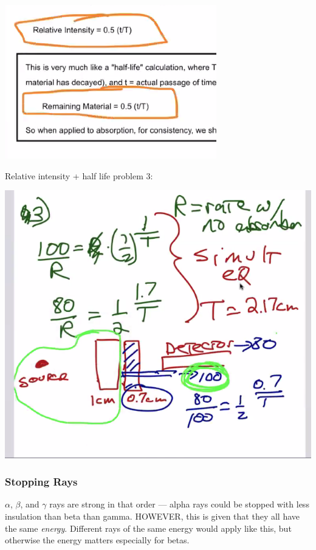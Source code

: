 \documentclass[letterpaper]{article}
\begin{document}
\begin{center}
\includegraphics[width=.9\linewidth]{halflife.png}
\end{center}

Relative intensity + half life problem 3:

\begin{center}
\includegraphics[width=.9\linewidth]{halflifeproctice.png}
\end{center}

\subsubsection{Stopping Rays}
\label{sec:org4965fa0}
\(\alpha\), \(\beta\), and \(\gamma\) rays are strong in that order ---
alpha rays could be stopped with less insulation than beta than gamma.
HOWEVER, this is given that they all have the same \emph{energy}. Different
rays of the same energy would apply like this, but otherwise the energy
matters especially for betas.
\end{document}
